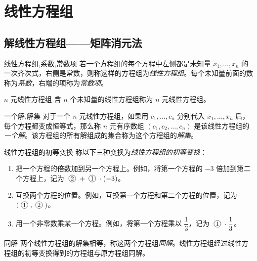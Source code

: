 
\chapter{线性方程组}

\section{解线性方程组——矩阵消元法}

\begin{definition}{线性方程组,系数,常数项}
	若一个方程组的每个方程中左侧都是未知量 $x_1, \ldots, x_n$ 的一次齐次式，右侧是常数，则称这样的方程组为\emph{线性方程组}。每个未知量前面的数称为\emph{系数}，右端的项称为\emph{常数项}。
\end{definition}

\begin{definition}{$n$ 元线性方程组}
	含 $n$ 个未知量的线性方程组称为 $n$ 元线性方程组。
\end{definition}

\begin{definition}{一个解,解集}
	对于一个 $n$ 元线性方程组，如果用 $c_1, \ldots, c_n$ 分别代入 $x_1, \ldots, x_n$ 后，每个方程都变成恒等式，那么称 $n$ 元有序数组 $(c_1, c_2, \ldots, c_n)$ 是该线性方程组的\emph{一个解}。该方程组的所有解组成的集合称为这个方程组的\emph{解集}。
\end{definition}

\begin{definition}{线性方程组的初等变换}
	称以下三种变换为\emph{线性方程组的初等变换}：
	\begin{enumerate}
		\item 把一个方程的倍数加到另一个方程上。例如，将第一个方程的 $-3$ 倍加到第二个方程上，记为 $\circled{2} +\circled{1} \cdot (-3)$。
		\item 互换两个方程的位置。例如，互换第一个方程和第二个方程的位置，记为 $(\circled{1}, \circled{2})$。
		\item 用一个非零数乘某一个方程。例如，将第一个方程乘以 $\dfrac{1}{3}$，记为 $\circled{1} \cdot \dfrac{1}{3}$。
	\end{enumerate}
\end{definition}

\begin{definition}{同解}
	两个线性方程组的解集相等，称这两个方程组\emph{同解}。线性方程组经过线性方程组的初等变换得到的方程组与原方程组同解。
\end{definition}